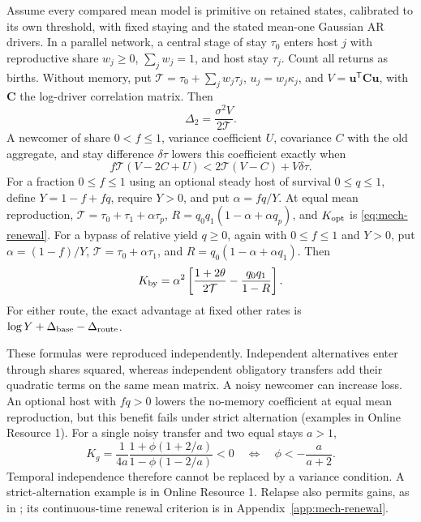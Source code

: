 \begin{proposition}\label{prop:mech-routes}
Assume every compared mean model is primitive on retained states, calibrated to its own threshold, with fixed staying and the stated mean-one Gaussian AR drivers. In a parallel network, a central stage of stay \(\tau_0\) enters host \(j\) with reproductive share \(w_j\geq0\), \(\sum_jw_j=1\), and host stay \(\tau_j\). Count all returns as births. Without memory, put \(\mathcal T=\tau_0+\sum_jw_j\tau_j\), \(u_j=w_j\kappa_j\), and \(V=\mathbf u^{\mathsf T}\mathbf C\mathbf u\), with \(\mathbf C\) the log-driver correlation matrix. Then
\begin{equation}\label{eq:mech-parallel}
 \Delta_2=\frac{\sigma^2V}{2\mathcal T}.
\end{equation}
A newcomer of share \(0<f\leq1\), variance coefficient \(U\), covariance \(C\) with the old aggregate, and stay difference \(\delta\tau\) lowers this coefficient exactly when
\begin{equation}\label{eq:mech-newcomer}
 f\mathcal T(V-2C+U)<2\mathcal T(V-C)+V\delta\tau.
\end{equation}
For a fraction \(0\leq f\leq1\) using an optional steady host of survival \(0\leq q\leq1\), define \(Y=1-f+fq\), require \(Y>0\), and put \(\alpha=fq/Y\). At equal mean reproduction, \(\mathcal T=\tau_0+\tau_1+\alpha\tau_p\), \(R=q_0q_1(1-\alpha+\alpha q_p)\), and \(K_{\rm opt}\) is \eqref{eq:mech-renewal}. For a bypass of relative yield \(q\geq0\), again with \(0\leq f\leq1\) and \(Y>0\), put \(\alpha=(1-f)/Y\), \(\mathcal T=\tau_0+\alpha\tau_1\), and \(R=q_0(1-\alpha+\alpha q_1)\). Then
\begin{equation}\label{eq:mech-bypass}
 K_{\rm by}=\alpha^2\left[\frac{1+2\theta}{2\mathcal T}-\frac{q_0q_1}{1-R}\right].
\end{equation}
For either route, the exact advantage at fixed other rates is \(\log Y+\Delta_{\rm base}-\Delta_{\rm route}\).
\end{proposition}
These formulas were reproduced independently. Independent alternatives enter through shares squared, whereas independent obligatory transfers add their quadratic terms on the same mean matrix. A noisy newcomer can increase loss. An optional host with \(fq>0\) lowers the no-memory coefficient at equal mean reproduction, but this benefit fails under strict alternation (examples in Online Resource 1). For a single noisy transfer and two equal stays \(a>1\),
\begin{equation}\label{eq:mech-negative-memory}
 K_g=\frac{1}{4a}\frac{1+\phi(1+2/a)}{1-\phi(1-2/a)}<0
 \quad\Longleftrightarrow\quad \phi<-\frac{a}{a+2}.
\end{equation}
Temporal independence therefore cannot be replaced by a variance condition. A strict-alternation example is in Online Resource 1. Relapse also permits gains, as in \citet{white2016}; its continuous-time renewal criterion is in Appendix~\ref{app:mech-renewal}.

